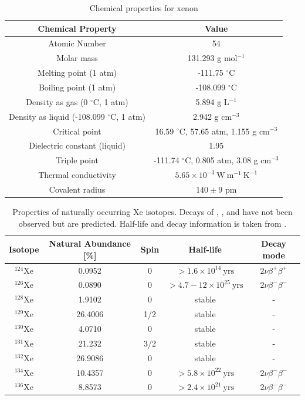 \begin{table}[t]
 \centering
 \begin{tabular}{cc}
 \hline
 Chemical Property & Value \\
 \hline
 Atomic Number & 54 \\
 Molar mass & 131.293 g mol$^{-1}$ \\
 Melting point (1 atm) & -111.75 $^{\circ}$C \\
 Boiling point (1 atm) & -108.099 $^{\circ}$C \\
 Density as gas (0 $^{\circ}$C, 1 atm)  &  5.894 g L$^{-1}$ \\
 Density as liquid (-108.099 $^{\circ}$C, 1 atm) & 2.942 g cm$^{-3}$ \\
 Critical point & 16.59 $^{\circ}$C, 57.65 atm, 1.155 g cm$^{-3}$ \\
 Dielectric constant (liquid) & 1.95 \\
 Triple point & -111.74 $^{\circ}$C, 0.805 atm, 3.08 g cm$^{-3}$ \\
 Thermal conductivity & $5.65 \times 10^{-3}\ \mathrm{W\ m^{-1}\ K^{-1}}$ \\
 Covalent radius & $140 \pm 9$ pm \\
 \hline
 \end{tabular}
 \caption{Chemical properties for xenon}
\label{tab:xe_properties}
\end{table}


\begin{table}
 \centering
 \begin{tabular}{ccccc}
 \hline
 Isotope & Natural Abundance [\%] & Spin & Half-life & Decay mode \\
 \hline
 $^{124}$Xe & 0.0952 & 0 &  $> 1.6 \times 10^{14}\ \mathrm{yrs}$ & $2\nu \beta^{+} \beta^{+}$ \\
 $^{126}$Xe & 0.0890 & 0 & $> 4.7-12 \times 10^{25}\ \mathrm{yrs}$ & $2\nu \beta^{-} \beta^{-}$ \\
 $^{128}$Xe & 1.9102 & 0 & stable & - \\
 $^{129}$Xe & 26.4006 & 1/2 & stable & - \\
 $^{130}$Xe & 4.0710 & 0 & stable & - \\
 $^{131}$Xe & 21.232 & 3/2 & stable & - \\
 $^{132}$Xe & 26.9086 & 0 & stable & - \\
 $^{134}$Xe & 10.4357 & 0 &  $> 5.8 \times 10^{22}\ \mathrm{yrs}$ & $2\nu \beta^{-} \beta^{-}$ \\
 $^{136}$Xe & 8.8573 & 0 &  $> 2.4 \times 10^{21}\ \mathrm{yrs}$ & $2\nu \beta^{-} \beta^{-}$ \\
 \hline
 \end{tabular}
 \caption{Properties of naturally occurring Xe isotopes.  Decays of , , and  have not been observed
 but are predicted.  Half-life and decay information is taken from .}
\label{tab:xe_isotopes}
\end{table}


